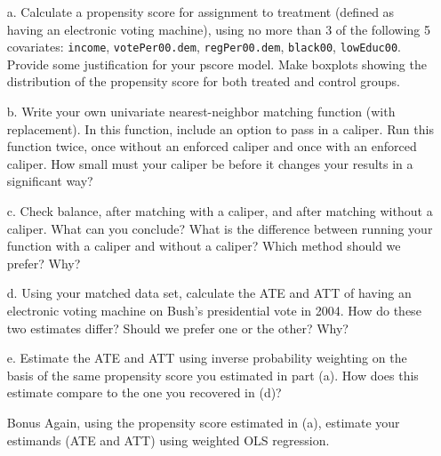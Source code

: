 \documentclass{article}
\begin{document}
\begin{itemize}
\item[a.] Calculate a propensity score for assignment to
  treatment (defined as having an electronic voting machine), using no
  more than 3 of the following 5 covariates: \texttt{income},
  \texttt{votePer00.dem}, \texttt{regPer00.dem}, \texttt{black00}, 
  \texttt{lowEduc00}. Provide
  some justification for your pscore model. Make boxplots showing the
  distribution of the propensity score for both treated and control
  groups.%
\item[b.] Write your own univariate nearest-neighbor matching function
  (with replacement). In this function, include an option to pass in a
  caliper. Run this function twice, once without an enforced caliper
  and once with an enforced caliper. How small must your caliper be
  before it changes your results in a significant way? 
\item[c.] Check balance, after matching with a caliper, and after
  matching without a caliper. What can you conclude?  What is the
  difference between running your function with a caliper and without
  a caliper? Which method should we prefer? Why?
\item[d.] Using your matched data set, calculate the ATE and ATT of
  having an electronic voting machine on Bush's presidential vote in 2004.  How do these two estimates
  differ?  Should we prefer one or the other?  Why?  
\item[e.] Estimate the ATE and ATT using inverse probability weighting on the basis of the same
  propensity score you estimated in part (a).  How does this estimate
  compare to the one you recovered in (d)?
\item[Bonus] Again, using the propensity score estimated in (a),
  estimate your estimands (ATE and ATT) using weighted OLS regression.
\end{itemize}



\newpage
\end{document}
